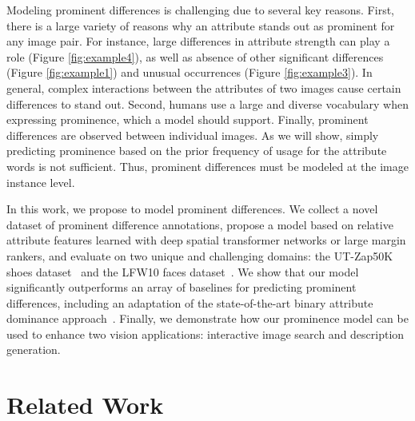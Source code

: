 \documentclass[10pt,twocolumn,letterpaper]{article}
\begin{document}
Modeling prominent differences is challenging due to several key reasons. First, there is a large variety of reasons why an attribute stands out as prominent for any image pair. For instance, large differences in attribute strength can play a role (Figure \ref{fig:example4}), as well as absence of other significant differences (Figure \ref{fig:example1}) and unusual occurrences (Figure \ref{fig:example3}). In general, complex interactions between the attributes of two images cause certain differences to stand out. Second, humans use a large and diverse vocabulary when expressing prominence, which a model should support. Finally, prominent differences are observed between individual images. As we will show, simply predicting prominence based on the prior frequency of usage for the attribute words is not sufficient. Thus, prominent differences must be modeled at the image instance level.

In this work, we propose to model prominent differences. We collect a novel dataset of prominent difference annotations, propose a model based on relative attribute features learned with deep spatial transformer networks or large margin rankers, and evaluate on two unique and challenging domains: the UT-Zap50K shoes dataset~\cite{finegrained} and the LFW10 faces dataset~\cite{relativeparts}. We show that our model significantly outperforms an array of baselines for predicting prominent differences, including an adaptation of the state-of-the-art binary attribute dominance approach~\cite{dominance}. Finally, we demonstrate how our prominence model can be used to enhance two vision applications: interactive image search and description generation.

\section{Related Work}
\end{document}
